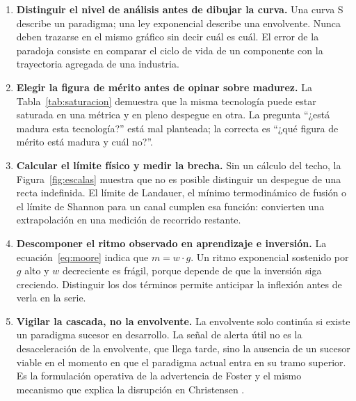 \documentclass[11pt,letterpaper]{article}
\begin{document}
\begin{enumerate}
  \item \textbf{Distinguir el nivel de análisis antes de dibujar la curva.} Una
    curva S describe un paradigma; una ley exponencial describe una envolvente.
    Nunca deben trazarse en el mismo gráfico sin decir cuál es cuál. El error de
    la paradoja consiste en comparar el ciclo de vida de un componente con la
    trayectoria agregada de una industria.
  \item \textbf{Elegir la figura de mérito antes de opinar sobre madurez.} La
    Tabla~\ref{tab:saturacion} demuestra que la misma tecnología puede estar
    saturada en una métrica y en pleno despegue en otra. La pregunta
    \enquote{¿está madura esta tecnología?} está mal planteada; la correcta es
    \enquote{¿qué figura de mérito está madura y cuál no?}.
  \item \textbf{Calcular el límite físico y medir la brecha.} Sin un cálculo del
    techo, la Figura~\ref{fig:escalas} muestra que no es posible distinguir un
    despegue de una recta indefinida. El límite de Landauer, el mínimo
    termodinámico de fusión o el límite de Shannon para un canal cumplen esa
    función: convierten una extrapolación en una medición de recorrido restante.
  \item \textbf{Descomponer el ritmo observado en aprendizaje e inversión.} La
    ecuación~\eqref{eq:moore} indica que $m = w \cdot g$. Un ritmo exponencial
    sostenido por $g$ alto y $w$ decreciente es frágil, porque depende de que la
    inversión siga creciendo. Distinguir los dos términos permite anticipar la
    inflexión antes de verla en la serie.
  \item \textbf{Vigilar la cascada, no la envolvente.} La envolvente solo
    continúa si existe un paradigma sucesor en desarrollo. La señal de alerta
    útil no es la desaceleración de la envolvente, que llega tarde, sino la
    ausencia de un sucesor viable en el momento en que el paradigma actual entra
    en su tramo superior. Es la formulación operativa de la advertencia de Foster
    y el mismo mecanismo que explica la disrupción en Christensen
    \parencite{foster1986,christensen1997}.
\end{enumerate}
\end{document}

